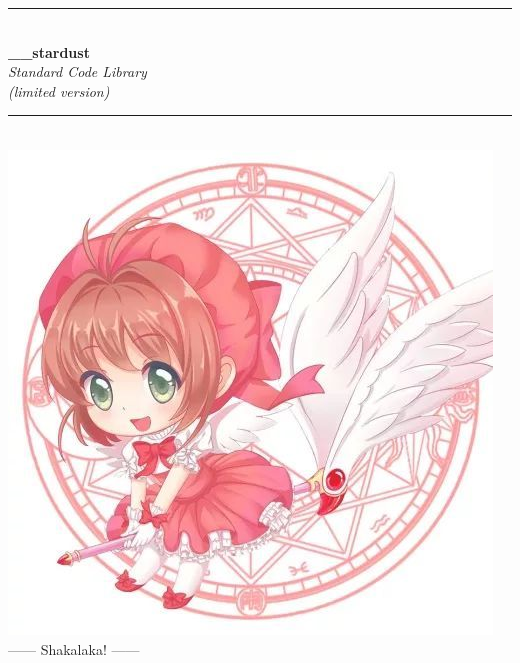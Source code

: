 \documentclass[titlepage, openany]{book}
\begin{document}
    \begin{titlepage}
        \centering
        \rule{\linewidth}{0.5mm}\\[0.4cm]
        {\Huge\bfseries \_\_stardust}\\[\baselineskip]
        {\textit {\Large Standard Code Library}}\\
        {\textit {\small (limited version)}}\\[0.4cm]
        \rule{\linewidth}{0.5mm}\\[2cm]
        \vfill
        \includegraphics[scale=0.4]{pictures/sakura.jpeg}\\[0.4cm]
        {\large ------ Shakalaka! ------}
        \vfill
        \\[0.1cm]
        \\[0.1cm]
        \\[0.4cm]

\end{titlepage}
\end{document}
